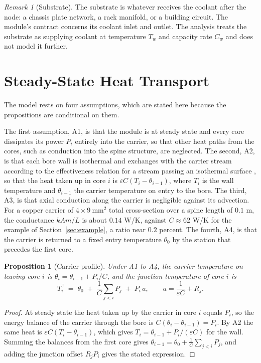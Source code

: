 \documentclass[11pt,openany]{book}
\theoremstyle{plain}
\newtheorem{proposition}[theorem]{Proposition}
\theoremstyle{definition}
\theoremstyle{remark}
\newtheorem{remark}[theorem]{Remark}
\begin{document}
\begin{remark}[Substrate]
The substrate is whatever receives the coolant after the node: a chassis plate network, a rack manifold, or a building circuit. The module's contract concerns its coolant inlet and outlet. The analysis treats the substrate as supplying coolant at temperature $T_w$ and capacity rate $C_w$ and does not model it further.
\end{remark}

\section{Steady-State Heat Transport}
\label{sec:model}

The model rests on four assumptions, which are stated here because the propositions are conditional on them.

The first assumption, A1, is that the module is at steady state and every core dissipates its power $P_i$ entirely into the carrier, so that other heat paths from the cores, such as conduction into the spine structure, are neglected. The second, A2, is that each bore wall is isothermal and exchanges with the carrier stream according to the effectiveness relation for a stream passing an isothermal surface \cite{kayslondon}, so that the heat taken up in core $i$ is $\varepsilon C(T_i-\theta_{i-1})$, where $T_i$ is the wall temperature and $\theta_{i-1}$ the carrier temperature on entry to the bore. The third, A3, is that axial conduction along the carrier is negligible against its advection. For a copper carrier of $4\times 9\ \mathrm{mm}^2$ total cross-section over a spine length of $0.1$ m, the conductance $kAm/L$ is about $0.14$ W/K, against $C\approx 62$ W/K for the example of Section~\ref{sec:example}, a ratio near $0.2$ percent. The fourth, A4, is that the carrier is returned to a fixed entry temperature $\theta_0$ by the station that precedes the first core.

\begin{proposition}[Carrier profile]\label{prop:profile}
Under A1 to A4, the carrier temperature on leaving core $i$ is $\theta_i=\theta_{i-1}+P_i/C$, and the junction temperature of core $i$ is
\[
T^{\mathrm{J}}_i \;=\; \theta_0 \;+\; \frac1C\sum_{j<i}P_j \;+\; P_i\,a,
\qquad a=\frac{1}{\varepsilon C}+R_j .
\]
\end{proposition}
\begin{proof}
At steady state the heat taken up by the carrier in core $i$ equals $P_i$, so the energy balance of the carrier through the bore is $C(\theta_i-\theta_{i-1})=P_i$. By A2 the same heat is $\varepsilon C(T_i-\theta_{i-1})$, which gives $T_i=\theta_{i-1}+P_i/(\varepsilon C)$ for the wall. Summing the balances from the first core gives $\theta_{i-1}=\theta_0+\frac1C\sum_{j<i}P_j$, and adding the junction offset $R_jP_i$ gives the stated expression.
\end{proof}
\end{document}
